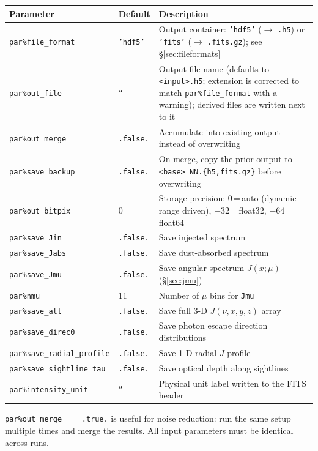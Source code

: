 \documentclass[english,a4paper]{my_memo}
\newcommand{\parm}[1]{\texttt{par\%#1}}
\begin{document}
\begin{center}
\begin{tabularx}{\linewidth}{@{}lL{2.0cm}X@{}}
\toprule
Parameter & Default & Description \\
\midrule
\parm{file\_format} & \texttt{'hdf5'} & Output container: \texttt{'hdf5'} ($\to$ \texttt{.h5}) or \texttt{'fits'} ($\to$ \texttt{.fits.gz}); see \S\ref{sec:fileformats} \\
\parm{out\_file}   & \texttt{''} & Output file name (defaults to \texttt{<input>.h5}; extension is corrected to match \parm{file\_format} with a warning); derived files are written next to it \\
\parm{out\_merge}  & \texttt{.false.} & Accumulate into existing output instead of overwriting \\
\parm{save\_backup} & \texttt{.false.} & On merge, copy the prior output to \texttt{<base>\_NN.\{h5,fits.gz\}} before overwriting \\
\parm{out\_bitpix} & $0$ & Storage precision: $0$\,=\,auto (dynamic-range driven), $-32$\,=\,float32, $-64$\,=\,float64 \\
\parm{save\_Jin}   & \texttt{.false.} & Save injected spectrum \\
\parm{save\_Jabs}  & \texttt{.false.} & Save dust-absorbed spectrum \\
\parm{save\_Jmu}   & \texttt{.false.} & Save angular spectrum $J(x;\mu)$ (\S\ref{sec:jmu}) \\
\parm{nmu}         & 11               & Number of $\mu$ bins for \texttt{Jmu} \\
\parm{save\_all}   & \texttt{.false.} & Save full 3-D $J(\nu,x,y,z)$ array \\
\parm{save\_direc0} & \texttt{.false.} & Save photon escape direction distributions \\
\parm{save\_radial\_profile} & \texttt{.false.} & Save 1-D radial $J$ profile \\
\parm{save\_sightline\_tau} & \texttt{.false.} & Save optical depth along sightlines \\
\parm{intensity\_unit} & \texttt{''} & Physical unit label written to the FITS header \\
\bottomrule
\end{tabularx}
\end{center}

\parm{out\_merge}~$=$~\texttt{.true.} is useful for noise reduction: run the same setup
multiple times and merge the results.  All input parameters must be identical across runs.
\end{document}
